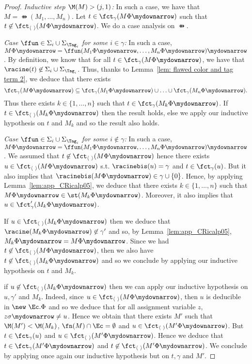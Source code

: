 \begin{proof}
\medskip

 \noindent \emph{Inductive step $\M(M) > (j,1)$:} In such a case, we have that $M = \ffun(M_1,\ldots, M_n)$. Let $t \in \fct_\gamma(M\Phi\mydownarrow)$ such that $t \not\in \fctpair(M\Phi\mydownarrow)$. We do a case analysis on $\ffun$.

\smallskip{}

 \emph{Case $\ffun \in \Sigma_i \cup \Sigma_{\Tag_i}$ for some $i \in \gamma$:} In such a  case, $M\Phi\mydownarrow = \ffun(M_1\Phi\mydownarrow, \ldots,
 M_n\Phi\mydownarrow)\mydownarrow$. By definition, we know that for all $t \in
 \fct_\gamma(M\Phi\mydownarrow)$, we have that $\racine(t) \not\in \Sigma_i \cup
 \Sigma_{\Tag_i}$. Thus, thanks to Lemma~\ref{lem: flawed color and tag term 2}, we 
 deduce that there exists 
\[
\fct_\gamma(M\Phi\mydownarrow) \subseteq  \fct_\gamma(M_1\Phi\mydownarrow)
\cup \ldots \cup \fct_\gamma(M_n\Phi\mydownarrow).
\] 
Thus there exists $k \in \{1, \ldots, n\}$ such that $t \in \fct_\gamma(M_k\Phi\mydownarrow)$. If $t \in \fctpair(M_k\Phi\mydownarrow)$ then the result holds, else we apply our inductive hypothesis on $t$ and $M_k$ and so the result also holds.

\smallskip{}

 \emph{Case $\ffun \in \Sigma_i \cup \Sigma_{\Tag_i}$ for some $i \not\in \gamma$:} In such a  case, $M\Phi\mydownarrow = \ffun(M_1\Phi\mydownarrow, \ldots, M_n\Phi\mydownarrow)\mydownarrow$. We assumed that $t \not\in \fctpair(M\Phi\mydownarrow)$ hence there exists $u \in \fctpair(M\Phi\mydownarrow)$ s.t. $\racinebis(u) = \gamma$ and $t \in \fct_\gamma(u)$. But it also implies that $\racinebis(M\Phi\mydownarrow) \in \gamma \cup \{ 0 \}$. Hence, by applying Lemma~\ref{lem:app_CRicalp05}, we deduce that there exists $k \in \{1, \ldots, n\}$ such that $M\Phi\mydownarrow \in \st(M_k\Phi\mydownarrow)$. Moreover, it also implies that $u \in \fct_\gamma'(M_k\Phi\mydownarrow)$. 
 
 If $u \in \fctpair(M_k\Phi\mydownarrow)$ then we deduce that $\racine(M_k\Phi\mydownarrow) \not\in \gamma'$ and so, by Lemma~\ref{lem:app_CRicalp05}, $M_k\Phi\mydownarrow = M\Phi\mydownarrow$. Since we had $t \not\in \fctpair(M\Phi\mydownarrow)$, then we also have $t \not\in \fctpair(M_k\Phi\mydownarrow)$ and so we conclude by applying our inductive hypothesis on $t$ and $M_k$.
 
 if $u \not\in \fctpair(M_k\Phi\mydownarrow)$ then we can apply our inductive hypothesis on $u, \gamma'$ and $M_k$. Indeed, since $u \in \fctpair(M\Phi\mydownarrow)$, then $u$ is deducible in $\new\ \Ec. \Phi$ and so we deduce that for all assignment variable $z$, $z\sigma\mydownarrow \neq u$. Hence we obtain that there exists $M'$ such that $\M(M') < \M(M_k)$, $\fn(M) \cap \Ec = \emptyset$ and $u \in \fctpair(M'\Phi\mydownarrow)$. But $t \in \fct_\gamma(u)$ and $u \in \fctpair(M'\Phi\mydownarrow)$. Hence we deduce that $t \in \fct_\gamma(M'\Phi\mydownarrow)$ and $t \not\in \fctpair(M'\Phi\mydownarrow)$. We conclude by applying once again our inductive hypothesis but on $t, \gamma$ and $M'$.
 

\end{proof}
